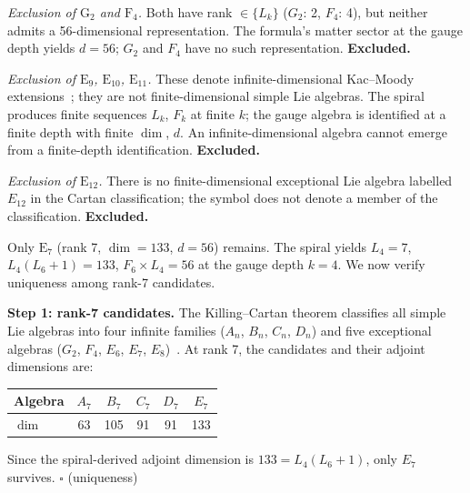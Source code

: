 \documentclass[12pt,a4paper]{article}
\begin{document}
\textit{Exclusion of $\mathrm{G}_2$ and $\mathrm{F}_4$.} Both have rank $\in \{L_k\}$ ($G_2$: 2, $F_4$: 4), but neither admits a 56-dimensional representation. The formula's matter sector at the gauge depth yields $d = 56$; $G_2$ and $F_4$ have no such representation. \textbf{Excluded.}

\textit{Exclusion of $\mathrm{E}_9$, $\mathrm{E}_{10}$, $\mathrm{E}_{11}$.} These denote infinite-dimensional Kac--Moody extensions~\cite{Kac1990}; they are not finite-dimensional simple Lie algebras. The spiral produces finite sequences $L_k$, $F_k$ at finite $k$; the gauge algebra is identified at a finite depth with finite $\dim$, $d$. An infinite-dimensional algebra cannot emerge from a finite-depth identification. \textbf{Excluded.}

\textit{Exclusion of $\mathrm{E}_{12}$.} There is no finite-dimensional exceptional Lie algebra labelled $E_{12}$ in the Cartan classification; the symbol does not denote a member of the classification. \textbf{Excluded.}

\medskip
\noindent Only $\mathrm{E}_7$ (rank 7, $\dim = 133$, $d = 56$) remains. The spiral yields $L_4 = 7$, $L_4(L_6+1) = 133$, $F_6 \times L_4 = 56$ at the gauge depth $k = 4$. We now verify uniqueness among rank-7 candidates.

\textbf{Step 1: rank-7 candidates.} The Killing--Cartan theorem classifies all simple Lie algebras into four infinite families ($A_n$, $B_n$, $C_n$, $D_n$) and five exceptional algebras ($G_2$, $F_4$, $E_6$, $E_7$, $E_8$)~\cite{Adams1996}. At rank 7, the candidates and their adjoint dimensions are:
\begin{center}
\begin{tabular}{l|ccccc}
Algebra & $A_7$ & $B_7$ & $C_7$ & $D_7$ & $E_7$ \\
\hline
$\dim$ & 63 & 105 & 91 & 91 & 133 \\
\end{tabular}
\end{center}
Since the spiral-derived adjoint dimension is $133 = L_4(L_6+1)$, only $E_7$ survives. \hfill$\square$ (uniqueness)
\end{document}

